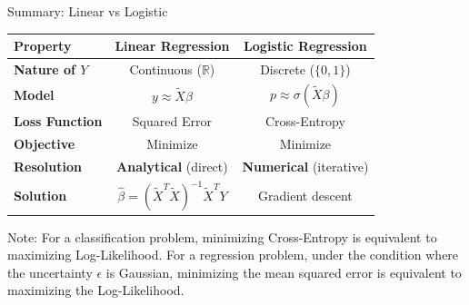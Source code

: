 \begin{frame}{Summary: Linear vs Logistic}
	\begin{table}
		\renewcommand{\arraystretch}{1.5} %
		\begin{tabular}{|l|c|c|}
			\hline
			\textbf{Property} & \textbf{Linear Regression} & \textbf{Logistic Regression} \\ \hline
			\textbf{Nature of $Y$} & Continuous ($\mathbb{R}$) & Discrete ($\{0, 1\}$) \\ \hline
			\textbf{Model} & $y \approx \tilde{X}\beta$ & $p \approx \sigma(\tilde{X}\beta)$ \\ \hline
			\textbf{Loss Function} & Squared Error & Cross-Entropy \\ \hline
			\textbf{Objective} & Minimize & Minimize \\ \hline
			\textbf{Resolution} & \textbf{Analytical} (direct) & \textbf{Numerical} (iterative) \\ \hline
			\textbf{Solution} & $\hat{\beta} = (\tilde{X}^T\tilde{X})^{-1}\tilde{X}^TY$ & Gradient descent \\ \hline
		\end{tabular}
	\end{table}
	Note: For a classification problem, minimizing Cross-Entropy is equivalent to maximizing Log-Likelihood. For a regression problem, under the condition where the uncertainty $\epsilon$ is Gaussian, minimizing the mean squared error is equivalent to maximizing the Log-Likelihood.
\end{frame}